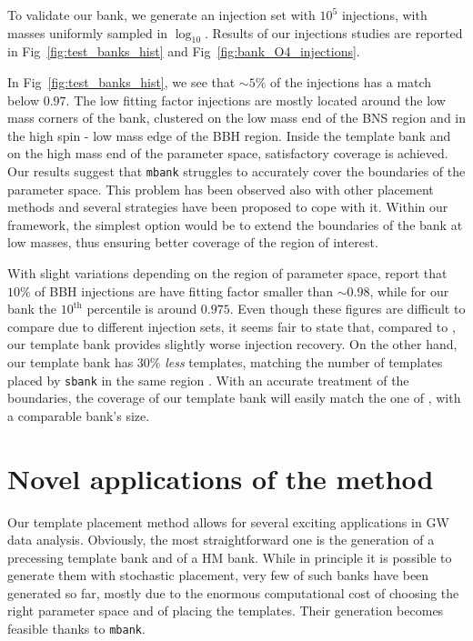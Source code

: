 \documentclass[twocolumn,showpacs,preprintnumbers,nofootinbib,prd,
superscriptaddress,10pt]{revtex4-2}
\begin{document}
To validate our bank, we generate an injection set with $10^5$ injections, with masses uniformly sampled in $\log_{10}$.
Results of our injections studies are reported in Fig~\ref{fig:test_banks_hist} and Fig~\ref{fig:bank_O4_injections}.

In Fig~\ref{fig:test_banks_hist}, we see that $\sim 5\%$ of the injections has a match below $0.97$. The low fitting factor injections are mostly located around the low mass corners of the bank, clustered on the low mass end of the BNS region and in the high spin - low mass edge of the BBH region.
Inside the template bank and on the high mass end of the parameter space, satisfactory coverage is achieved.
Our results suggest that \texttt{mbank} struggles to accurately cover the boundaries of the parameter space. This problem has been observed also with other placement methods and several strategies have been proposed to cope with it. Within our framework, the simplest option would be to extend the boundaries of the bank at low masses, thus ensuring better coverage of the region of interest.

With slight variations depending on the region of parameter space, \cite{Sakon:2022ibh} report that $10\%$ of BBH injections are have fitting factor smaller than $\sim 0.98$, while for our bank the $10^\text{th}$ percentile is around $0.975$.
Even though these figures are difficult to compare due to different injection sets, it seems fair to state that, compared to \cite{Sakon:2022ibh}, our template bank provides slightly worse injection recovery.
On the other hand, our template bank has $30\%$ {\it less} templates, matching the number of templates placed by \texttt{sbank} in the same region \cite{Sakon:2022ibh}. With an accurate treatment of the boundaries, the coverage of our template bank will easily match the one of \cite{Sakon:2022ibh}, with a comparable bank's size.


\section{Novel applications of the method} \label{sec:novel_applications}

Our template placement method allows for several exciting applications in GW data analysis.
Obviously, the most straightforward one is the generation of a precessing template bank and of a HM bank. While in principle it is possible to generate them with stochastic placement, very few of such banks have been generated so far, mostly due to the enormous computational cost of choosing the right parameter space and of placing the templates. Their generation becomes feasible thanks to \texttt{mbank}.
\end{document}
